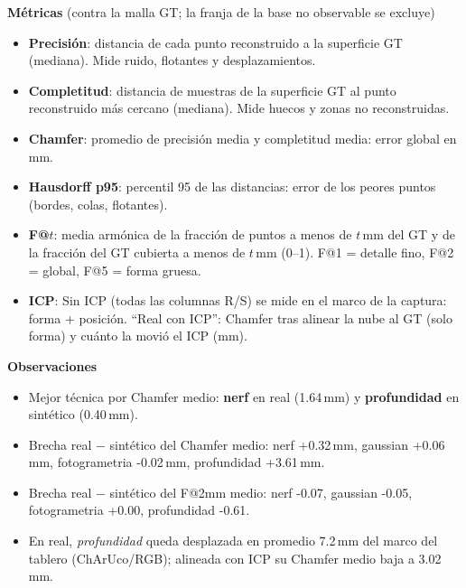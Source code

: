 \documentclass[10pt]{article}
\begin{document}
\par\noindent\begin{minipage}[t]{0.49\textwidth}\footnotesize
\textbf{M\'etricas} (contra la malla GT; la franja de la base no observable se excluye)
\begin{itemize}\setlength\itemsep{0pt}
\item \textbf{Precisi\'on}: distancia de cada punto reconstruido a la superficie GT (mediana). Mide ruido, flotantes y desplazamientos.
\item \textbf{Completitud}: distancia de muestras de la superficie GT al punto reconstruido m\'as cercano (mediana). Mide huecos y zonas no reconstruidas.
\item \textbf{Chamfer}: promedio de precisi\'on media y completitud media: error global en mm.
\item \textbf{Hausdorff p95}: percentil 95 de las distancias: error de los peores puntos (bordes, colas, flotantes).
\item \textbf{F@$t$}: media arm\'onica de la fracci\'on de puntos a menos de $t$\,mm del GT y de la fracci\'on del GT cubierta a menos de $t$\,mm (0--1). F@1 = detalle fino, F@2 = global, F@5 = forma gruesa.
\item \textbf{ICP}: Sin ICP (todas las columnas R/S) se mide en el marco de la captura: forma + posici\'on. ``Real con ICP'': Chamfer tras alinear la nube al GT (solo forma) y cu\'anto la movi\'o el ICP (mm).
\end{itemize}\end{minipage}\hfill\begin{minipage}[t]{0.49\textwidth}\footnotesize
\textbf{Observaciones}
\begin{itemize}\setlength\itemsep{0pt}
\item Mejor t\'ecnica por Chamfer medio: \textbf{nerf} en real (1.64\,mm) y \textbf{profundidad} en sint\'etico (0.40\,mm).
\item Brecha real $-$ sint\'etico del Chamfer medio: nerf +0.32\,mm, gaussian +0.06\,mm, fotogrametria -0.02\,mm, profundidad +3.61\,mm.
\item Brecha real $-$ sint\'etico del F@2mm medio: nerf -0.07, gaussian -0.05, fotogrametria +0.00, profundidad -0.61.
\item En real, \textit{profundidad} queda desplazada en promedio 7.2\,mm del marco del tablero (ChArUco/RGB); alineada con ICP su Chamfer medio baja a 3.02\,mm.
\end{itemize}\end{minipage}
\end{document}
